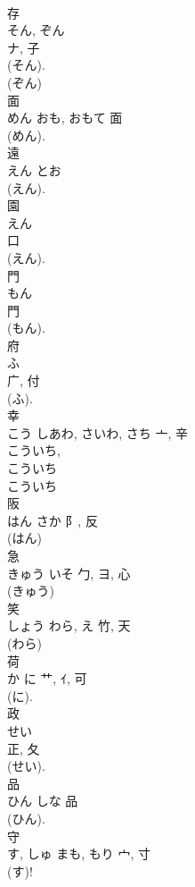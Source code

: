 \documentclass[8pt]{extreport}
\begin{document}
\begin{CJK}{UTF8}{min}
\\	存	
\\	そん, ぞん	
\\	ナ, 子		
\\	(そん). 
\\	(ぞん) 
\\	面	
\\	めん	おも, おもて	面	
\\	(めん). 
\\	遠	
\\	えん	とお		
\\	(えん). 
\\	園	
\\	えん	
\\	口		
\\	(えん).	
\\	門	
\\	もん	
\\	門	
\\	(もん). 
\\	府	
\\	ふ	
\\	广, 付	
\\	(ふ). 
\\	幸	
\\	こう	しあわ, さいわ, さち	亠, 辛	
\\	こういち, 
\\	こういち 
\\	こういち 
\\	阪	
\\	はん	さか	阝, 反	
\\	(はん) 
\\	急	
\\	きゅう	いそ	勹, ヨ, 心	
\\	(きゅう) 
\\	笑	
\\	しょう	わら, え	竹, 天	
\\	(わら) 
\\	荷	
\\	か	に	艹, ｲ, 可	
\\	(に). 
\\	政	
\\	せい	
\\	正, 夂	
\\	(せい). 
\\	品	
\\	ひん	しな	品	
\\	(ひん). 
\\	守	
\\	す, しゅ	まも, もり	宀, 寸	
\\	(す)! 

\end{CJK}
\end{document}
